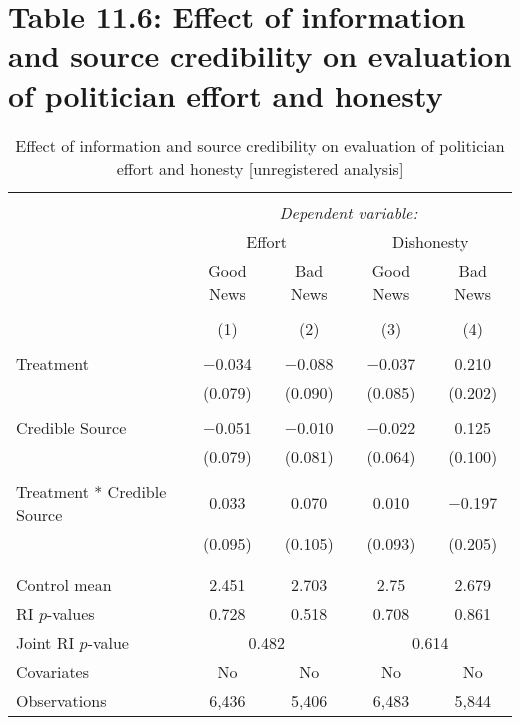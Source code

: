 \documentclass[]{article}
\begin{document}
\clearpage

\section{Table 11.6: Effect of information and source credibility on
evaluation of politician effort and
honesty}\label{table-11.6-effect-of-information-and-source-credibility-on-evaluation-of-politician-effort-and-honesty}

\begin{table}[!htbp] \centering 
  \caption{Effect of information and source credibility on evaluation of politician effort and honesty [unregistered analysis]} 
  \label{effort_honesty_credibility} 
\begin{tabular}{@{\extracolsep{1pt}}lcccc} 
\\[-1.8ex]\hline 
\hline \\[-1.8ex] 
 & \multicolumn{4}{c}{\textit{Dependent variable:}} \\ 
\cline{2-5} 
& \multicolumn{2}{c}{Effort}&\multicolumn{2}{c}{Dishonesty}\\
\cline{2-5}
 & Good News & Bad News & Good News & Bad News \\ 
\\[-1.8ex] & (1) & (2) & (3) & (4)\\ 
\hline \\[-1.8ex] 
 Treatment & $-$0.034 & $-$0.088 & $-$0.037 & 0.210 \\ 
  & (0.079) & (0.090) & (0.085) & (0.202) \\ 
  & & & & \\ 
 Credible Source & $-$0.051 & $-$0.010 & $-$0.022 & 0.125 \\ 
  & (0.079) & (0.081) & (0.064) & (0.100) \\ 
  & & & & \\ 
 Treatment * Credible Source & 0.033 & 0.070 & 0.010 & $-$0.197 \\ 
  & (0.095) & (0.105) & (0.093) & (0.205) \\ 
  & & & & \\ 
\hline \\[-1.8ex] 
Control mean & 2.451 & 2.703 & 2.75 & 2.679 \\ 
RI $p$-values & 0.728 & 0.518 & 0.708 & 0.861 \\ 
Joint RI $p$-value & \multicolumn{2}{c}{0.482} & \multicolumn{2}{c}{0.614} \\
Covariates & No & No & No & No \\ 
Observations & 6,436 & 5,406 & 6,483 & 5,844 \\ 

\end{tabular}
\end{table}
\end{document}

